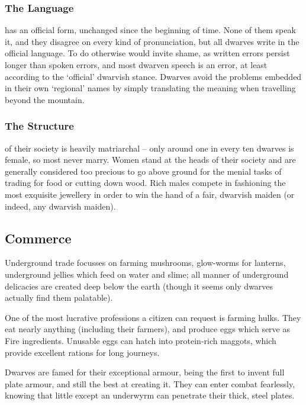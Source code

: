 \subsubsection[The Dwarven Language]{The Language}
has an official form, unchanged since the beginning of time.
None of them speak it, and they disagree on every kind of pronunciation, but all dwarves write in the official language.
To do otherwise would invite shame, as written errors persist longer than spoken errors, and most dwarven speech is an error, at least according to the `official' dwarvish stance.
Dwarves avoid the problems embedded in their own `regional' names by simply translating the meaning when travelling beyond the mountain.

\subsubsection{The Structure}
\label{dwarven_structure}
of their society is heavily matriarchal -- only around one in every ten dwarves is female, so most never marry.
Women stand at the heads of their society and are generally considered too precious to go above ground for the menial tasks of trading for food or cutting down wood.
Rich males compete in fashioning the most exquisite jewellery in order to win the hand of a fair, dwarvish maiden (or indeed, any dwarvish maiden).

\subsection{Commerce}

Underground trade focusses on farming mushrooms, glow-worms for lanterns, underground jellies which feed on water and slime; all manner of underground delicacies are created deep below the earth (though it seems only dwarves actually find them palatable).

One of the most lucrative professions a citizen can request is farming \glspl{hulk}.
They eat nearly anything (including their farmers), and produce eggs which serve as Fire \glspl{ingredient}.
Unusable eggs can hatch into protein-rich maggots, which provide excellent \glspl{ration} for long journeys.

Dwarves are famed for their exceptional armour, being the first to invent full plate armour, and still the best at creating it.
They can enter combat fearlessly, knowing that little except an underwyrm can penetrate their thick, steel plates.


